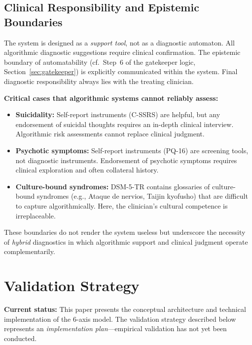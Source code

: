 \documentclass[11pt,a4paper]{article}
\begin{document}
\subsection{Clinical Responsibility and Epistemic Boundaries}

The system is designed as a \textit{support tool}, not as a diagnostic automaton. All algorithmic diagnostic suggestions require clinical confirmation. The epistemic boundary of automatability (cf.\ Step~6 of the gatekeeper logic, Section~\ref{sec:gatekeeper}) is explicitly communicated within the system. Final diagnostic responsibility always lies with the treating clinician.

\textbf{Critical cases that algorithmic systems cannot reliably assess:}
\begin{itemize}[noitemsep]
\item \textbf{Suicidality:} Self-report instruments (C-SSRS) are helpful, but any endorsement of suicidal thoughts requires an in-depth clinical interview. Algorithmic risk assessments cannot replace clinical judgment.
\item \textbf{Psychotic symptoms:} Self-report instruments (PQ-16) are screening tools, not diagnostic instruments. Endorsement of psychotic symptoms requires clinical exploration and often collateral history.
\item \textbf{Culture-bound syndromes:} DSM-5-TR contains glossaries of culture-bound syndromes (e.g., Ataque de nervios, Taijin kyofusho) that are difficult to capture algorithmically. Here, the clinician's cultural competence is irreplaceable.
\end{itemize}

These boundaries do not render the system useless but underscore the necessity of \textit{hybrid} diagnostics in which algorithmic support and clinical judgment operate complementarily.

\section{Validation Strategy}
\label{sec:validation}

\textbf{Current status:} This paper presents the conceptual architecture and technical implementation of the 6-axis model. The validation strategy described below represents an \textit{implementation plan}---empirical validation has not yet been conducted.
\end{document}
